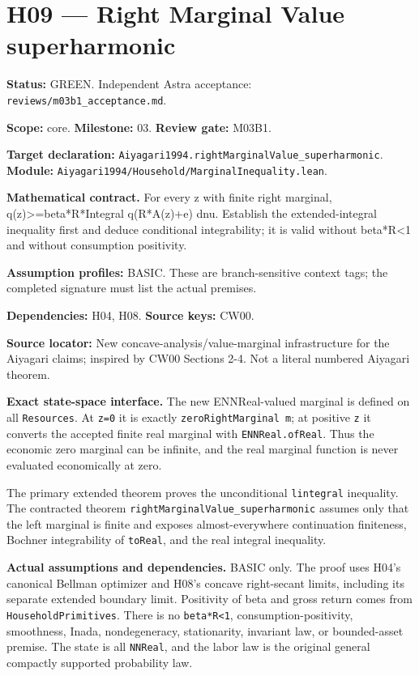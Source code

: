\documentclass[
  11pt,
]{article}
\let\LedgerOriginalTexttt\texttt
\renewcommand{\texttt}[1]{{\small\LedgerOriginalTexttt{#1}}}
\begin{document}
\section{H09 --- Right Marginal Value
superharmonic}\label{h09-right-marginal-value-superharmonic}

\textbf{Status:} GREEN. Independent Astra acceptance:
\texttt{reviews/m03b1\_acceptance.md}.

\textbf{Scope:} core. \textbf{Milestone:} 03. \textbf{Review gate:}
M03B1.

\textbf{Target declaration:}
\texttt{Aiyagari1994.rightMarginalValue\_superharmonic}.\\
\textbf{Module:}
\texttt{Aiyagari1994/Household/MarginalInequality.lean}.

\textbf{Mathematical contract.} For every z with finite right marginal,
q(z)\textgreater=beta*R*Integral q(R*A(z)+e) dnu. Establish the
extended-integral inequality first and deduce conditional integrability;
it is valid without beta*R\textless1 and without consumption positivity.

\textbf{Assumption profiles:} BASIC. These are branch-sensitive context
tags; the completed signature must list the actual premises.

\textbf{Dependencies:} H04, H08. \textbf{Source keys:} CW00.

\textbf{Source locator:} New concave-analysis/value-marginal
infrastructure for the Aiyagari claims; inspired by CW00 Sections 2-4.
Not a literal numbered Aiyagari theorem.

\textbf{Exact state-space interface.} The new ENNReal-valued marginal is
defined on all \texttt{Resources}. At \texttt{z=0} it is exactly
\texttt{zeroRightMarginal\ m}; at positive \texttt{z} it converts the
accepted finite real marginal with \texttt{ENNReal.ofReal}. Thus the
economic zero marginal can be infinite, and the real marginal function
is never evaluated economically at zero.

The primary extended theorem proves the unconditional \texttt{lintegral}
inequality. The contracted theorem
\texttt{rightMarginalValue\_superharmonic} assumes only that the left
marginal is finite and exposes almost-everywhere continuation
finiteness, Bochner integrability of \texttt{toReal}, and the real
integral inequality.

\textbf{Actual assumptions and dependencies.} BASIC only. The proof uses
H04's canonical Bellman optimizer and H08's concave right-secant limits,
including its separate extended boundary limit. Positivity of beta and
gross return comes from \texttt{HouseholdPrimitives}. There is no
\texttt{beta*R\textless{}1}, consumption-positivity, smoothness, Inada,
nondegeneracy, stationarity, invariant law, or bounded-asset premise.
The state is all \texttt{NNReal}, and the labor law is the original
general compactly supported probability law.
\end{document}
